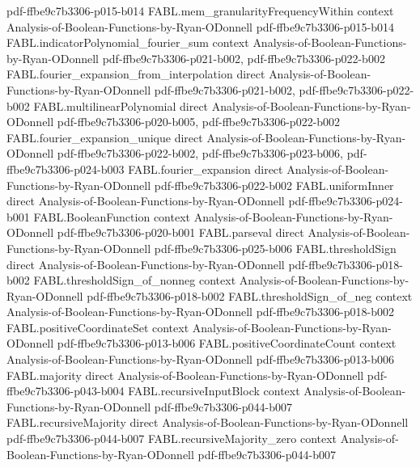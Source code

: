 \begin{theorem}
  {pdf-ffbe9c7b3306-p015-b014}
\proofstep
  {FABL.mem_granularityFrequencyWithin}
  {context}
  {Analysis-of-Boolean-Functions-by-Ryan-ODonnell}
  {pdf-ffbe9c7b3306-p015-b014}
\proofstep
  {FABL.indicatorPolynomial_fourier_sum}
  {context}
  {Analysis-of-Boolean-Functions-by-Ryan-ODonnell}
  {pdf-ffbe9c7b3306-p021-b002,
    pdf-ffbe9c7b3306-p022-b002}
\proofstep
  {FABL.fourier_expansion_from_interpolation}
  {direct}
  {Analysis-of-Boolean-Functions-by-Ryan-ODonnell}
  {pdf-ffbe9c7b3306-p021-b002,
    pdf-ffbe9c7b3306-p022-b002}
\proofstep
  {FABL.multilinearPolynomial}
  {direct}
  {Analysis-of-Boolean-Functions-by-Ryan-ODonnell}
  {pdf-ffbe9c7b3306-p020-b005,
    pdf-ffbe9c7b3306-p022-b002}
\proofstep
  {FABL.fourier_expansion_unique}
  {direct}
  {Analysis-of-Boolean-Functions-by-Ryan-ODonnell}
  {pdf-ffbe9c7b3306-p022-b002,
    pdf-ffbe9c7b3306-p023-b006,
    pdf-ffbe9c7b3306-p024-b003}
\proofstep
  {FABL.fourier_expansion}
  {direct}
  {Analysis-of-Boolean-Functions-by-Ryan-ODonnell}
  {pdf-ffbe9c7b3306-p022-b002}
\proofstep
  {FABL.uniformInner}
  {direct}
  {Analysis-of-Boolean-Functions-by-Ryan-ODonnell}
  {pdf-ffbe9c7b3306-p024-b001}
\proofstep
  {FABL.BooleanFunction}
  {context}
  {Analysis-of-Boolean-Functions-by-Ryan-ODonnell}
  {pdf-ffbe9c7b3306-p020-b001}
\proofstep
  {FABL.parseval}
  {direct}
  {Analysis-of-Boolean-Functions-by-Ryan-ODonnell}
  {pdf-ffbe9c7b3306-p025-b006}
\proofstep
  {FABL.thresholdSign}
  {direct}
  {Analysis-of-Boolean-Functions-by-Ryan-ODonnell}
  {pdf-ffbe9c7b3306-p018-b002}
\proofstep
  {FABL.thresholdSign_of_nonneg}
  {context}
  {Analysis-of-Boolean-Functions-by-Ryan-ODonnell}
  {pdf-ffbe9c7b3306-p018-b002}
\proofstep
  {FABL.thresholdSign_of_neg}
  {context}
  {Analysis-of-Boolean-Functions-by-Ryan-ODonnell}
  {pdf-ffbe9c7b3306-p018-b002}
\proofstep
  {FABL.positiveCoordinateSet}
  {context}
  {Analysis-of-Boolean-Functions-by-Ryan-ODonnell}
  {pdf-ffbe9c7b3306-p013-b006}
\proofstep
  {FABL.positiveCoordinateCount}
  {context}
  {Analysis-of-Boolean-Functions-by-Ryan-ODonnell}
  {pdf-ffbe9c7b3306-p013-b006}
\proofstep
  {FABL.majority}
  {direct}
  {Analysis-of-Boolean-Functions-by-Ryan-ODonnell}
  {pdf-ffbe9c7b3306-p043-b004}
\proofstep
  {FABL.recursiveInputBlock}
  {context}
  {Analysis-of-Boolean-Functions-by-Ryan-ODonnell}
  {pdf-ffbe9c7b3306-p044-b007}
\proofstep
  {FABL.recursiveMajority}
  {direct}
  {Analysis-of-Boolean-Functions-by-Ryan-ODonnell}
  {pdf-ffbe9c7b3306-p044-b007}
\proofstep
  {FABL.recursiveMajority_zero}
  {context}
  {Analysis-of-Boolean-Functions-by-Ryan-ODonnell}
  {pdf-ffbe9c7b3306-p044-b007}

\end{theorem}
